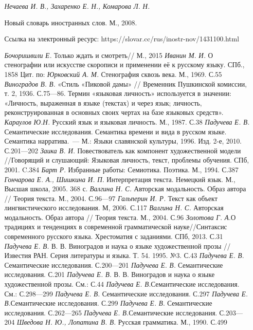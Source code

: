 {\textit{{Нечаева И. В., Захаренко Е. Н., Комарова Л. Н. }}{Новый словарь иностранных слов. М., 2008. 

    Ссылка на электронный ресурс: https://slovar.cc/rus/inostr-nov/1431100.html}}
{\textit{Бочоришвили Е.} Только ждать и смотреть// М., 2015}
{\textit{Иванин М. И. }О стенографии или искусстве скорописи и применении её к русскому языку. СПб., 1858}
{{ Цит. по: }\textit{{Юрковский А. М.
      }}{Стенография сквозь века. М., 1969. С.55}}
{\textit{{Виноградов В. В. }}{«Стиль «Пиковой дамы» // Временник Пушкинской комиссии, т. 2, 1936. С.75—86.}}
{{Термин «языковая личность» используется в значении: «Личность, выраженная в языке (текстах) и через язык; личность, реконструированная в основных своих чертах на базе языковых средств». }\textit{{Караулов Ю.Н. }}{Русский язык и языковая личность. М., 1987. С.38}}
{\textit{{Падучева Е. В. }}{Семантические исследования. Семантика времени и вида в русском языке. Семантика нарратива.~--- М.: Языки славянской культуры, 1996. Изд. 2-е, 2010. С.201—202}}
{\textit{{Заика В. И. }}{Повествователь как компонент художественной модели //Говорящий и слушающий: Языковая личность, текст, проблемы обучения. СПб, 2001. C.384}}
{\textit{{Барт Р.}}{ Избранные работы: Семиотика. Поэтика. М., 1994. С.387}}
{\textit{{Гончарова Е. А., Шишкина И. П. }}{Интерпретация текста. Немецкий язык. М., Высшая школа, 2005. 368 с. }}
{\textit{{Валгина Н. С. }}{Авторская модальность. Образ автора // Теория текста. М., 2004. С.96—97}}
{\textit{{Гальперин И. Р. }}{Текст как объект лингвистического исследования. М, 2006. С.117}}
{\textit{{Валгина Н. С. }}{Авторская модальность. Образ автора // Теория текста. М., 2004. С.96}}
{\textit{Золотова Г. А.}О традициях и тенденциях в современной грамматической науке//Синтаксис современного русского языка. Хрестоматия с заданиями. СПб, 2013. С.31}
{\textit{Падучева Е. В. }В. В. Виноградов и наука о языке художественной прозы // Известия РАН. Серия литературы и языка. Т. 54. 1995. №3. С.43}
{\textit{Падучева Е. В. }Семантические исследования. С.200—201}
{\textit{ Падучева Е. В. }Семантические исследования. С.201}
{\textit{ Падучева Е. В.} В. В. Виноградов и наука о языке художественной прозы. См.: С.44}
{\textit{Падучева Е. В.}Семантические исследования. См.: С.298—299}
{\textit{ Падучева Е. В. }Семантические исследования. С.297}
{\textit{Падучева Е. В.}Семантические исследования. С.299}
{\textit{Падучева Е. В.} Семантические исследования. С.262—265}
{\textit{Падучева Е. В.}Семантические исследования. С.203—204}
{\textit{ Шведова Н. Ю., Лопатина В. В.} Русская грамматика. М., 1990. С.499}

